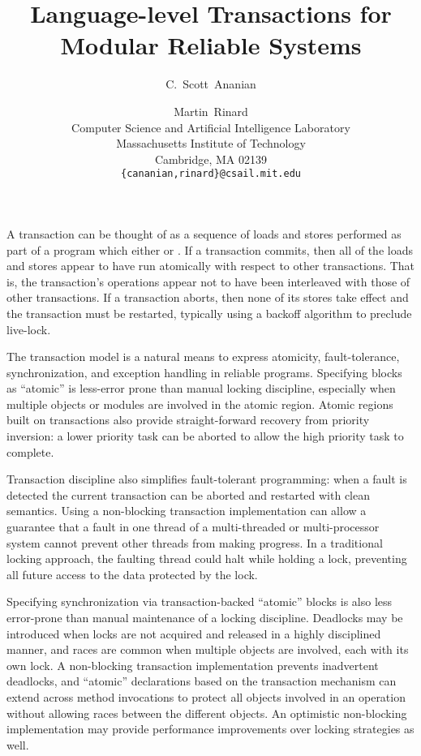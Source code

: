 \documentclass[twoside,twocolumn,notitlepage,letterpaper]{article}
\title{Language-level Transactions for Modular Reliable Systems}
\author{C.~Scott~Ananian \and Martin~Rinard \\
Computer Science and Artificial Intelligence Laboratory\\
Massachusetts Institute of Technology\\ 
Cambridge, MA 02139 \\
\texttt{\{cananian,rinard\}@csail.mit.edu}
}
\date{}
\begin{document}
\maketitle
{}

A transaction can be thought of as a sequence of loads and stores
performed as part of a program which either
 or .  If a transaction
commits, then all of the loads and stores appear to have run
atomically with respect to other transactions.  That is, the
transaction's operations appear not to have been interleaved with
those of other transactions.  If a transaction aborts, then none of
its stores take effect and the transaction must be restarted,
typically using a backoff algorithm to preclude live-lock.

The transaction model is a natural means to express atomicity, 
fault-tolerance, synchronization, and exception handling in reliable
programs.  Specifying blocks as ``atomic'' is less-error prone than
manual locking discipline, especially when multiple objects or
modules are involved in the atomic region.  Atomic regions built on
transactions also provide straight-forward recovery from priority
inversion: a lower priority task can be aborted to allow the high
priority task to complete.

Transaction discipline also simplifies fault-tolerant programming:
when a fault is detected the current transaction can be aborted and
restarted with clean semantics.  Using a non-blocking transaction
implementation can allow a guarantee that a fault in one thread of a
multi-threaded or multi-processor system cannot prevent other threads
from making progress.  In a traditional locking approach, the faulting
thread could halt while holding a lock, preventing all future access
to the data protected by the lock.

Specifying synchronization via transaction-backed ``atomic'' blocks
is also less error-prone than manual maintenance of a locking
discipline.  Deadlocks may be introduced when locks are not acquired
and released in a highly disciplined manner, and races are common when
multiple objects are involved, each with its own lock.  A non-blocking
transaction implementation prevents inadvertent deadlocks, and
``atomic'' declarations based on the transaction mechanism can extend
across method invocations to protect all objects involved in an
operation without allowing races between the different objects.  An
optimistic non-blocking implementation may provide performance
improvements over locking strategies as well.
\end{document}
